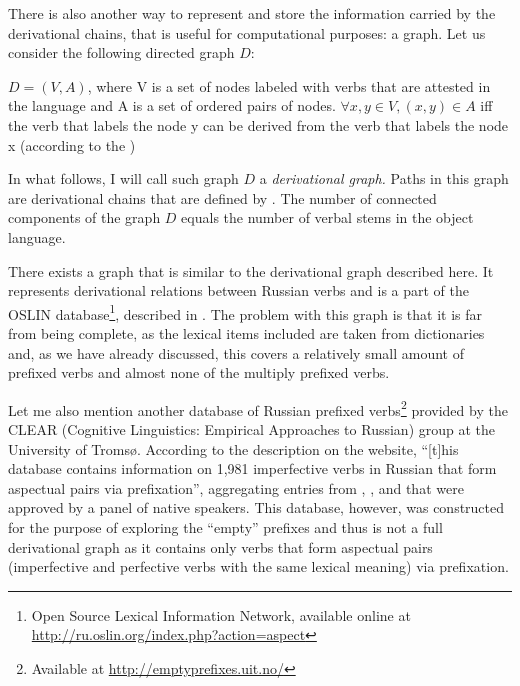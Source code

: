 There is also another way to represent and store the information carried by the derivational chains, that is useful for computational purposes: a graph. Let us consider the following directed graph $D$: 
\begin{definition}\label{def:chain}
$D = (V,A)$, where V is a set of nodes labeled with verbs that are attested in the language and A is a set of ordered pairs of nodes. $\forall x,y \in V, (x,y) \in A$ iff  the verb that labels the node y can be derived from the verb that labels the node x (according to the )
\end{definition}

In what follows, I will call such graph $D$ a \textit{derivational graph.} Paths in this graph are derivational chains that are defined by . The number of connected components of the graph $D$ equals the number of verbal stems in the object language.

There exists a graph that is similar to the derivational graph described here. It represents derivational relations between Russian verbs and is a part of the OSLIN database\footnote{Open Source Lexical Information Network, available online at \url{http://ru.oslin.org/index.php?action=aspect}}, described in \cite{Borik:12}. The problem with this graph is that it is far from being complete, as the lexical items included are taken from dictionaries and, as we have already discussed, this covers a relatively small amount of prefixed verbs and almost none of the multiply prefixed verbs.

Let me also mention another database of Russian prefixed verbs\footnote{Available at \url{http://emptyprefixes.uit.no/}} provided by the CLEAR (Cognitive Linguistics: Empirical Approaches to Russian) group at the University of Troms{\o}. According to the description on the website, ``[t]his database contains information on 1,981 imperfective verbs in Russian that form aspectual pairs via prefixation'', aggregating entries from \citet{MAS}, \citet{Ozegov:01},  and \citet{Cubberly:82} that were approved by a panel of native speakers. This database, however, was constructed for the purpose of exploring the ``empty'' prefixes and thus is not a full derivational graph as it contains only verbs that form aspectual pairs (imperfective and perfective verbs with the same lexical meaning) via prefixation.

